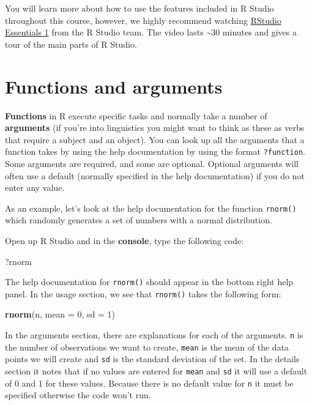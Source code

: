 \documentclass[]{book}
\newenvironment{Shaded}{\begin{snugshade}}{\end{snugshade}}
\newcommand{\DataTypeTok}[1]{\textcolor[rgb]{0.13,0.29,0.53}{#1}}
\newcommand{\DecValTok}[1]{\textcolor[rgb]{0.00,0.00,0.81}{#1}}
\newcommand{\KeywordTok}[1]{\textcolor[rgb]{0.13,0.29,0.53}{\textbf{#1}}}
\newcommand{\NormalTok}[1]{#1}
\begin{document}
You will learn more about how to use the features included in R Studio throughout this course, however, we highly recommend watching \href{https://www.rstudio.com/resources/webinars/rstudio-essentials-webinar-series-part-1/}{RStudio Essentials 1} from the R Studio team. The video lasts \textasciitilde{}30 minutes and gives a tour of the main parts of R Studio.

\hypertarget{functions-and-arguments}{%
\section{Functions and arguments}\label{functions-and-arguments}}

\textbf{Functions} in R execute specific tasks and normally take a number of \textbf{arguments} (if you're into linguistics you might want to think as these as verbs that require a subject and an object). You can look up all the arguments that a function takes by using the help documentation by using the format \texttt{?function}. Some arguments are required, and some are optional. Optional arguments will often use a default (normally specified in the help documentation) if you do not enter any value.

As an example, let's look at the help documentation for the function \texttt{rnorm()} which randomly generates a set of numbers with a normal distribution.

Open up R Studio and in the \textbf{console}, type the following code:

\begin{Shaded}
\begin{Highlighting}[]
\NormalTok{?rnorm}
\end{Highlighting}
\end{Shaded}

The help documentation for \texttt{rnorm()} should appear in the bottom right help panel. In the usage section, we see that \texttt{rnorm()} takes the following form:

\begin{Shaded}
\begin{Highlighting}[]
\KeywordTok{rnorm}\NormalTok{(n, }\DataTypeTok{mean =} \DecValTok{0}\NormalTok{, }\DataTypeTok{sd =} \DecValTok{1}\NormalTok{)}
\end{Highlighting}
\end{Shaded}

In the arguments section, there are explanations for each of the arguments. \texttt{n} is the number of observations we want to create, \texttt{mean} is the mean of the data points we will create and \texttt{sd} is the standard deviation of the set. In the details section it notes that if no values are entered for \texttt{mean} and \texttt{sd} it will use a default of 0 and 1 for these values. Because there is no default value for \texttt{n} it must be specified otherwise the code won't run.
\end{document}
